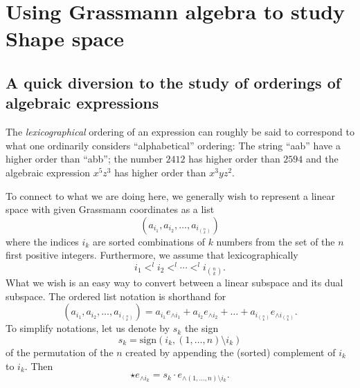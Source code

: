 \documentclass[a4paper,12pt]{book}
\theoremstyle{plain}
\theoremstyle{definition}
\begin{document}

\section{Using Grassmann algebra to study Shape space} %
\label{sec:using_grassmann_algebra_to_study_shape_space}

\subsection{A quick diversion to the study of orderings of algebraic expressions} %
\label{sub:a_quick_diversion_to_the_study_av_orderings_of_algebraic_expressions}

The \emph{lexicographical} ordering of an expression can roughly be said to correspond to what one
ordinarily considers ``alphabetical'' ordering: The string ``aab'' have a higher order than ``abb'';
the number \( 2412 \) has higher order than \( 2594 \) and the algebraic expression \( x^5 z^3 \)
has higher order than \( x^3 y z^2 \).

To connect to what we are doing here,
we generally wish to represent a linear space with given Grassmann
coordinates as a list
\[
	(a_{i_1}, a_{i_2}, \ldots, a_{i_{n \choose k}})
\]
where the indices \( i_k \) are sorted combinations of \( k \)
numbers from the set of the \( n \) first
positive integers. Furthermore, we assume that lexicographically
\[
	i_1 <^l i_2 <^l \cdots <^l i_{n \choose k}.
\]
What we wish is an easy way to convert between a linear subspace and its dual subspace.
The ordered list notation is shorthand for
\[
	(a_{i_1}, a_{i_2}, \ldots, a_{i_{n \choose k}}) =
	a_{i_1} e_{\wedge i_1} + a_{i_2} e_{\wedge i_2} +
	\ldots + a_{i_{n \choose k}} e_{\wedge i_{n \choose k}} .
\]
To simplify notations, let us denote by \( s_k \) the sign
\[
	s_k = \text{sign}{(i_k, (1, \ldots, n) \setminus i_k)}
\]
of the permutation of the \( n \)
created by appending the (sorted) complement of \( i_k \) to \( i_k \).
Then
\[
	\star e_{\wedge i_k} = s_k \cdot e_{\wedge (1,\ldots, n) \setminus i_k} .
\]
\end{document}
